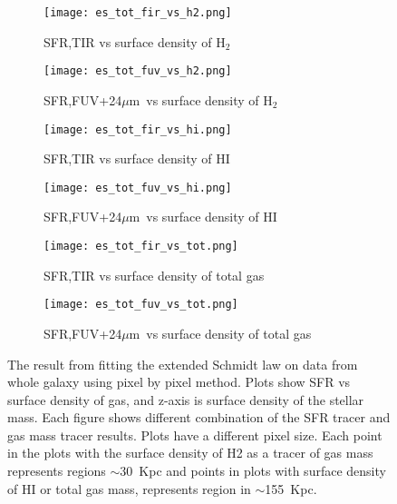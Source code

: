 \documentclass[useAMS,usenatbib]{mn2e}
\newcommand \um    {$\mu$m\ }
\begin{document}
\begin{figure*}
    \centering
    \begin{subfigure}[b]{0.3\textwidth}
        \centering
        \texttt{[image: es\_tot\_fir\_vs\_h2.png]}
        \caption{SFR,TIR vs surface density of H$_2$}
        \label{fig:es,all,fir,h2}
    \end{subfigure}
    \hfill
    \begin{subfigure}[b]{0.3\textwidth}
        \centering
        \texttt{[image: es\_tot\_fuv\_vs\_h2.png]}
        \caption{SFR,FUV+24\um vs surface density of H$_2$}
        \label{fig:es,all,fuv,h2}
    \end{subfigure}
    \hfill
    \begin{subfigure}[b]{0.3\textwidth}
        \texttt{[image: es\_tot\_fir\_vs\_hi.png]}
        \caption{SFR,TIR vs surface density of HI}
        \label{fig:es,all,fir,hi}
    \end{subfigure}
     \centering
    \begin{subfigure}[b]{0.3\textwidth}
        \centering
        \texttt{[image: es\_tot\_fuv\_vs\_hi.png]}
        \caption{SFR,FUV+24\um vs surface density of HI}
        \label{fig:es,all,fuv,hi}
    \end{subfigure}
    \hfill
    \begin{subfigure}[b]{0.3\textwidth}
        \centering
        \texttt{[image: es\_tot\_fir\_vs\_tot.png]}
        \caption{SFR,TIR vs surface density of total gas}
        \label{fig:es,all,fir,tot}
    \end{subfigure}
    \hfill
    \begin{subfigure}[b]{0.3\textwidth}
        \centering
        \texttt{[image: es\_tot\_fuv\_vs\_tot.png]}
        \caption{SFR,FUV+24\um vs surface density of total gas}
        \label{fig:es,all,fuv,tot}
    \end{subfigure}
    \caption{The result from fitting the extended Schmidt law on data from whole galaxy using pixel by pixel method. Plots show SFR vs surface density of gas, and z-axis is surface density of the stellar mass. Each figure shows different combination of the SFR tracer and gas mass tracer results. Plots have a different pixel size. Each point in the plots with the surface density of H2 as a tracer of gas mass represents regions $\sim$30~Kpc and points in plots with surface density of HI or total gas mass, represents region in $\sim$155~Kpc.}
    \label{fig:es,all}
\end{figure*}
\end{document}
